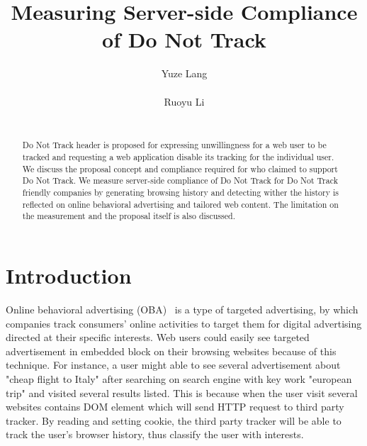 \documentclass{sig-alternate}
\begin{document}

\title{Measuring Server-side Compliance of Do Not Track}
\author{
\alignauthor
Yuze Lang\\
      \\
\alignauthor
Ruoyu Li\\
      \\
}

\newcommand{\todo}[1]{\textbf{[TODO: #1]}}

\maketitle
\begin{abstract}
Do Not Track header is proposed for expressing unwillingness for a web user to be tracked and requesting a web application disable its tracking for the individual user. We discuss the proposal concept and compliance required for who claimed to support Do Not Track. We measure server-side compliance of Do Not Track for Do Not Track friendly companies by generating browsing history and detecting wither the history is reflected on online behavioral advertising and tailored web content. The limitation on the measurement and the proposal itself is also discussed.
\end{abstract}



\section{Introduction}\label{sec:intro}
Online behavioral advertising (OBA)~\cite{sheltononline} is a type of targeted advertising, by which companies track consumers’ online activities to target them for digital advertising directed at their specific interests. Web users could easily see targeted advertisement in embedded block on their browsing websites because of this technique. For instance, a user might able to see several advertisement about "cheap flight to Italy" after searching on search engine with key work "european trip" and visited several results listed. This is because when the user visit several websites contains DOM element which will send HTTP request to third party tracker. By reading and setting cookie, the third party tracker will be able to track the user's browser history, thus classify the user with interests.
\end{document}

